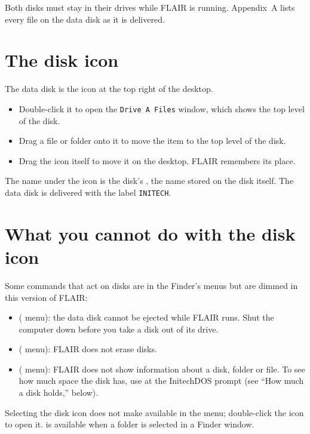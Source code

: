 Both disks must stay in their drives while FLAIR is running.  Appendix~A
lists every file on the data disk as it is delivered.

\section{The disk icon}
The data disk is the icon at the top right of the desktop.
\begin{itemize}
\item Double-click it to open the \texttt{Drive A Files} window, which
  shows the top level of the disk.
\item Drag a file or folder onto it to move the item to the top level of
  the disk.
\item Drag the icon itself to move it on the desktop.  FLAIR remembers its
  place.
\end{itemize}
The name under the icon is the disk's , the name stored
on the disk itself.  The data disk is delivered with the label
\texttt{INITECH}.

\section{What you cannot do with the disk icon}
Some commands that act on disks are in the Finder's menus but are dimmed in
this version of FLAIR:
\begin{itemize}
\item {} ( menu): the data disk cannot be
  ejected while FLAIR runs.  Shut the computer down before you take a disk
  out of its drive.
\item {} ( menu): FLAIR does not
  erase disks.
\item {} ( menu): FLAIR does not show
  information about a disk, folder or file.  To see how much space the disk
  has, use  at the InitechDOS prompt (see ``How much a disk
  holds,'' below).
\end{itemize}
Selecting the disk icon does not make  available in the
 menu; double-click the icon to open it.   is
available when a folder is selected in a Finder window.


